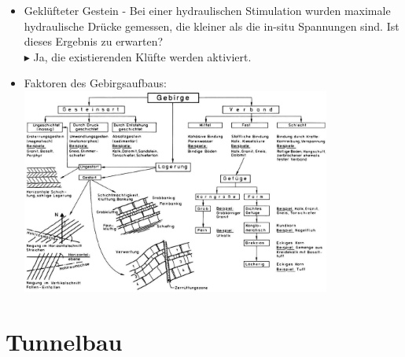 \documentclass[fleqn,twoside]{article}
\begin{document}
\begin{itemize}
    \item Geklüfteter Gestein - Bei einer hydraulischen Stimulation wurden maximale hydraulische Drücke gemessen, die kleiner als die in-situ Spannungen sind. Ist dieses Ergebnis zu erwarten?\\
    $\blacktriangleright$ Ja, die existierenden Klüfte werden aktiviert.
    
    \item Faktoren des Gebirgsaufbaus:\\
        \includegraphics[width=0.8\textwidth]{Grafiken/Faktoren_Gebirgsaufbau.png}
\end{itemize}




\section{Tunnelbau}
\end{document}

